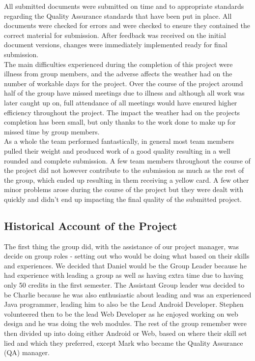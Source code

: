 \documentclass{article}
\begin{document}
		All submitted documents were submitted on time and to appropriate standards regarding the Quality Assurance standards that have been put in place. All documents were checked for errors and were checked to ensure they contained the correct material for submission. After feedback was received on the initial document versions, changes were immediately implemented ready for final submission. \\

		The main difficulties experienced during the completion of this project were illness from group members, and the adverse affects the weather had on the number of workable days for the project. Over the course of the project around half of the group have missed meetings due to illness and although all work was later caught up on, full attendance of all meetings would have ensured higher efficiency throughout the project. The impact the weather had on the projects completion has been small, but only thanks to the work done to make up for missed time by group members. \\

		As a whole the team performed fantastically, in general most team members pulled their weight and produced work of a good quality resulting in a well rounded and complete submission. A few team members throughout the course of the project did not however contribute to the submission as much as the rest of the group, which ended up resulting in them receiving a yellow card. A few other minor problems arose during the course of the project but they were dealt with quickly and didn't end up impacting the final quality of the submitted project. \\
		
		\subsection{Historical Account of the Project}
		The first thing the group did, with the assistance of our project manager, was decide on group roles - setting out who would be doing what based on their skills and experiences. We decided that Daniel would be the Group Leader because he had experience with leading a group as well as having extra time due to having only 50 credits in the first semester. The Assistant Group leader was decided to be Charlie because he was also enthusiastic about leading and was an experienced Java programmer, leading him to also be the Lead Android Developer. Stephen volunteered then to be the lead Web Developer as he enjoyed working on web design and he was doing the web modules. The rest of the group remember were then divided up into doing either Android or Web, based on where their skill set lied and which they preferred, except Mark who became the Quality Assurance (QA) manager. \\
\end{document}
